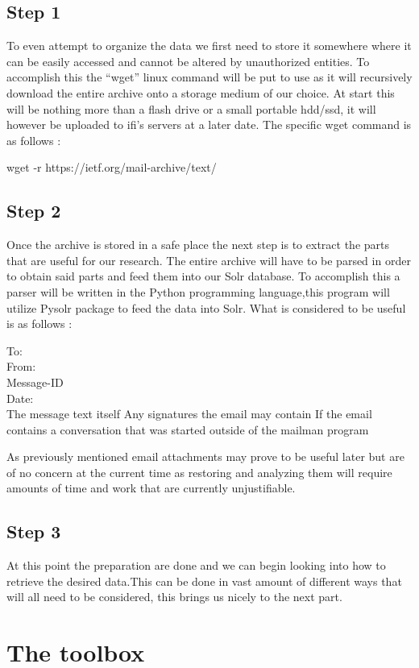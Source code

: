 \documentclass{report}
\begin{document}
\section{Step 1}
To even attempt to organize the data we first need to store it somewhere where it can be easily accessed and cannot be altered by unauthorized entities. To accomplish this the “wget” linux command will be put to use as it will recursively download the entire archive onto a storage medium of our choice. At start this will be nothing more than a flash drive or a small portable hdd/ssd, it will however be uploaded to ifi’s servers at a later date. The specific wget command is as follows :

wget -r https://ietf.org/mail-archive/text/ 

\section{Step 2}
Once the archive is stored in a safe place the next step is to extract the parts that are useful for our research. The entire archive will have to be parsed in order to obtain said parts and feed them into our Solr database. To accomplish this a parser will be written in the Python programming language,this program will utilize Pysolr package to feed the data into Solr. 
What is considered to be useful is as follows :

To: \\
From:\\
Message-ID\\
Date: \\
The message text itself
Any signatures the email may contain
If the email contains a conversation that was started outside of the mailman program

As previously mentioned email attachments may prove to be useful later but are of no concern at the current time as restoring and analyzing them will require amounts of time and work that are currently unjustifiable. 

\section{Step 3}
At this point the preparation are done and we can begin looking into how to retrieve the desired data.This can be done in vast amount of different ways that will all need to be considered, this brings us nicely to the next part.  

\chapter{The toolbox}
\end{document}

